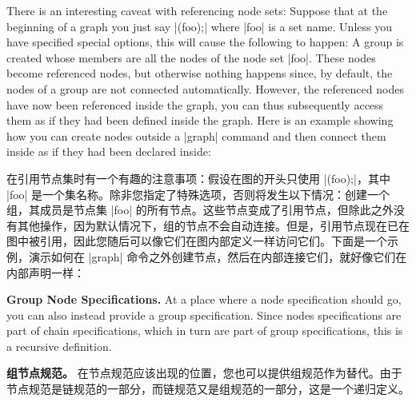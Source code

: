 There is an interesting caveat with referencing node sets: Suppose that at the
beginning of a graph you just say |(foo);| where |foo| is a set name. Unless
you have specified special options, this will cause the following to happen: A
group is created whose members are all the nodes of the node set |foo|. These
nodes become referenced nodes, but otherwise nothing happens since, by default,
the nodes of a group are not connected automatically. However, the referenced
nodes have now been referenced inside the graph, you can thus subsequently
access them as if they had been defined inside the graph. Here is an example
showing how you can create nodes outside a |graph| command and then connect
them inside as if they had been declared inside:

在引用节点集时有一个有趣的注意事项：假设在图的开头只使用 |(foo);|，其中 |foo| 是一个集名称。除非您指定了特殊选项，否则将发生以下情况：创建一个组，其成员是节点集 |foo| 的所有节点。这些节点变成了引用节点，但除此之外没有其他操作，因为默认情况下，组的节点不会自动连接。但是，引用节点现在已在图中被引用，因此您随后可以像它们在图内部定义一样访问它们。下面是一个示例，演示如何在 |graph| 命令之外创建节点，然后在内部连接它们，就好像它们在内部声明一样：


\begin{codeexample}[preamble={\usetikzlibrary{graphs}}]
\end{codeexample}

\medskip
\textbf{Group Node Specifications.} At a place where a node specification
should go, you can also instead provide a group specification. Since nodes
specifications are part of chain specifications, which in turn are part of
group specifications, this is a recursive definition.

\textbf{组节点规范。} 在节点规范应该出现的位置，您也可以提供组规范作为替代。由于节点规范是链规范的一部分，而链规范又是组规范的一部分，这是一个递归定义。


